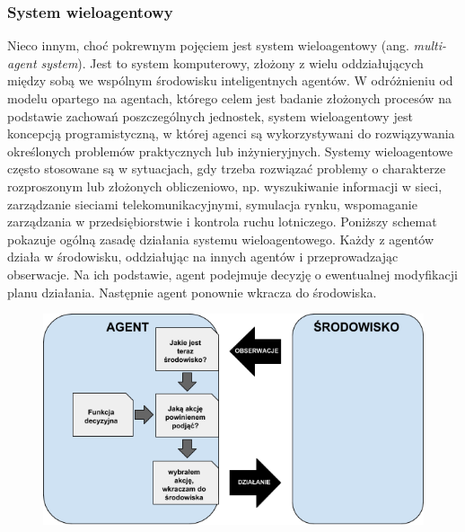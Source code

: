 \subsubsection{System wieloagentowy}
    Nieco innym, choć pokrewnym pojęciem jest system wieloagentowy (ang. \textit{multi-agent system}). Jest to system komputerowy, złożony z wielu oddziałujących między sobą we wspólnym środowisku inteligentnych agentów. W odróżnieniu od modelu opartego na agentach, którego celem jest badanie złożonych procesów na podstawie zachowań poszczególnych jednostek, system wieloagentowy jest koncepcją programistyczną, w której agenci są wykorzystywani do rozwiązywania określonych problemów praktycznych lub inżynieryjnych. Systemy wieloagentowe często stosowane są w sytuacjach, gdy trzeba rozwiązać problemy o charakterze rozproszonym lub złożonych obliczeniowo, np. wyszukiwanie informacji w sieci, zarządzanie sieciami telekomunikacyjnymi, symulacja rynku, wspomaganie zarządzania w przedsiębiorstwie i kontrola ruchu lotniczego\cite{wiki-agent}. Poniższy schemat pokazuje ogólną zasadę działania systemu wieloagentowego. Każdy z agentów działa w środowisku, oddziałując na innych agentów i przeprowadzając obserwacje. Na ich podstawie, agent podejmuje decyzję o ewentualnej modyfikacji planu działania. Następnie agent ponownie wkracza do środowiska.
    \begin{figure}[h]
        \includegraphics[width=\textwidth]{images/mopsim/multi-agent.png}
    \end{figure}
